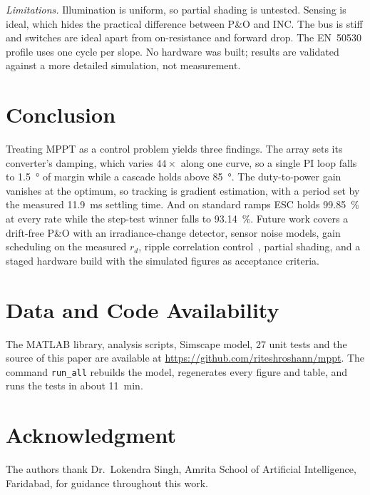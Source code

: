 \documentclass[journal]{IEEEtran}
\begin{document}
\emph{Limitations.} Illumination is uniform, so partial shading is untested. Sensing is ideal, which hides the
practical difference between P\&O and INC. The bus is stiff and switches are ideal apart from on-resistance and
forward drop. The EN~50530 profile uses one cycle per slope. No hardware was built; results are validated
against a more detailed simulation, not measurement.

\section{Conclusion}
Treating MPPT as a control problem yields three findings. The array sets its converter's damping, which varies
$44\times$ along one curve, so a single PI loop falls to \SI{1.5}{\degree} of margin while a cascade holds above
\SI{85}{\degree}. The duty-to-power gain vanishes at the optimum, so tracking is gradient estimation, with a
period set by the measured \SI{11.9}{\milli\second} settling time. And on standard ramps ESC holds
\SI{99.85}{\percent} at every rate while the step-test winner falls to \SI{93.14}{\percent}. Future work
covers a drift-free P\&O with an irradiance-change detector, sensor noise models, gain scheduling on the
measured $r_d$, ripple correlation control~\cite{rcc}, partial shading, and a staged hardware build with the
simulated figures as acceptance criteria.

\section*{Data and Code Availability}
The MATLAB library, analysis scripts, Simscape model, 27 unit tests and the source of this paper are available
at \url{https://github.com/riteshroshann/mppt}. The command \texttt{run\_all} rebuilds the model, regenerates
every figure and table, and runs the tests in about \SI{11}{\minute}.

\section*{Acknowledgment}
The authors thank Dr.~Lokendra Singh, Amrita School of Artificial Intelligence, Faridabad, for guidance
throughout this work.

{\footnotesize

}
\end{document}
